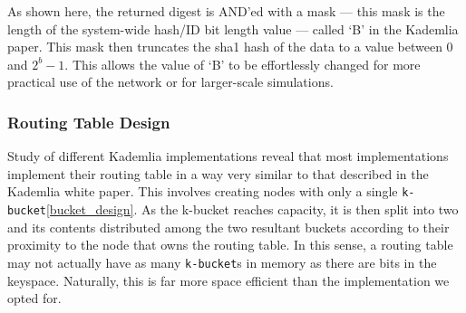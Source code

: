 \documentclass[12pt]{report}
\newcommand{\code}[1]{\colorbox{codegray}{\texttt{#1}}}
\begin{document}
            As shown here, the returned digest is AND'ed with a mask --- this
            mask is the length of the system-wide hash/ID bit length value ---
            called `B' in the Kademlia paper.  This mask then truncates the
            sha1 hash of the data to a value between 0 and $2^b-1$.  This
            allows the value of `B' to be effortlessly changed for more
            practical use of the network or for larger-scale simulations.

            \subsubsection{Routing Table Design}\label{routing_table_design}
                Study of different Kademlia
                implementations\cite{implementation_01}\cite{implementation_02}\cite{implementation_03}\cite{implementation_04}
                reveal that most implementations implement their routing table
                in a way very similar to that described in the Kademlia white
                paper\cite{kademlia}.  This involves creating nodes with only a
                single \code{k-bucket}\ref{bucket_design}.  As the k-bucket
                reaches capacity, it is then split into two and its contents
                distributed among the two resultant buckets according to their
                proximity to the node that owns the routing table.  In this
                sense, a routing table may not actually have as many
                \code{k-bucket}s
                in memory as there are bits in the keyspace.  Naturally, this
                is far more space efficient than the implementation we opted
                for.
\end{document}

